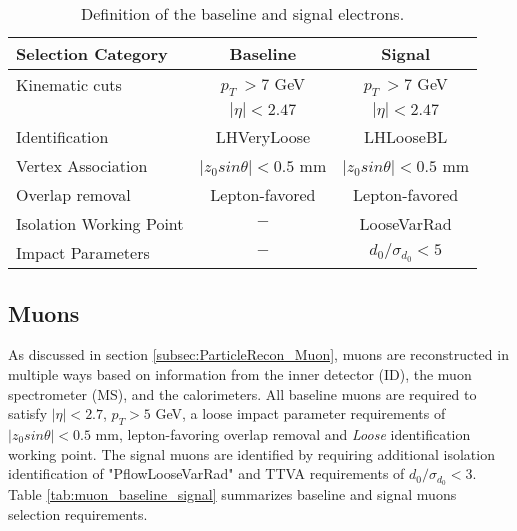 \begin{table}[ht]
	\centering
		\caption{Definition of the baseline and signal electrons.\label{tab:Electron_RecoSel}}
		\begin{tabular}{|| l || c | c ||}
		\hline
		Selection Category & \textbf{Baseline} & \textbf{Signal} \\
		\hline\hline
		Kinematic cuts & $p_{T}~ > 7$ GeV & $ p_{T}~ > 7$ GeV \\
		            & $|\eta| < 2.47$  &  $|\eta| < 2.47$\\
		\hline  
		Identification & LHVeryLoose & LHLooseBL \\
		\hline 
		Vertex Association & $|z_{0}sin\theta| < 0.5$ mm & $|z_{0}sin\theta|< 0.5$ mm\\
		\hline
		Overlap removal & Lepton-favored & Lepton-favored\\
		\hline
		Isolation Working Point & $-$ & LooseVarRad\\
		\hline 
		Impact Parameters & $-$ & $d_{0}/ \sigma_{d_{0}} < 5$ \\
		\hline
	\end{tabular}
\end{table}

\subsection{Muons}
\label{subsec:MuonRecon}
As discussed in section \ref{subsec:ParticleRecon_Muon}, muons are reconstructed in multiple ways based on information from the inner detector (ID), the muon spectrometer (MS), and the calorimeters. All baseline muons are required to satisfy $ |\eta| < 2.7 $, $p_{T} > 5$ GeV, a loose impact parameter requirements of $|z_{0}sin\theta| < 0.5 $ mm, lepton-favoring overlap removal and \textit{Loose} identification working point. The signal muons are identified by requiring additional isolation identification of "PflowLooseVarRad" and TTVA requirements of $d_{0}/\sigma_{d_{0}} < 3$. Table \ref{tab:muon_baseline_signal} summarizes baseline and signal muons selection requirements.

